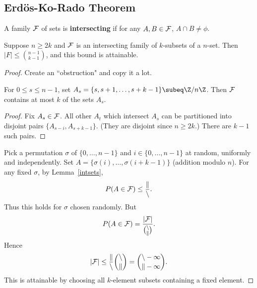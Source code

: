\subsection{Erd\"os-Ko-Rado Theorem}
\begin{df}
A family $\cal F$ of sets is \textbf{intersecting} if for any $A,B\in \cal F$, $A\cap B\neq \phi$. 
\end{df}
\begin{thm}
Suppose $n\geq 2k$ and $\cal F$ is an intersecting family of $k$-subsets of a $n$-set. Then $|F|\leq \binom{n-1}{k-1}$, and this bound is attainable.
\end{thm}
\begin{proof}
Create an ``obstruction" and copy it a lot.
\begin{lem}\label{intsets}
For $0\leq s\leq n-1$, set $A_s=\{s,s+1,\ldots, s+k-1\}\subeq \Z/n\Z$. Then $\cal F$ contains at most $k$ of the sets $A_s$.
\end{lem}
\begin{proof}
Fix $A_s\in \cal F$. All other $A_t$ which intersect $A_s$ can be partitioned into disjoint pairs $\{A_{s-i},A_{s+k-1}\}$. (They are disjoint since $n\geq 2k$.) There are $k-1$ such pairs.
\end{proof}
Pick a permutation $\sigma$ of $\{0,\ldots, n-1\}$ and $i\in \{0,\ldots, n-1\}$ at random, uniformly and independently. Set $A=\{\sigma(i),\ldots, \sigma(i+k-1)\}$ (addition modulo $n$). For any fixed $\sigma$, by Lemma~\ref{intsets},
\[
P(A\in \cal F)\leq \frac{k}{n}.
\]
Thus this holds for $\sigma$ chosen randomly. But
\[
P(A\in \cal F)=\frac{|F|}{\binom nk}.\]
Hence
\[
|\cal F|\leq \frac kn \binom nk=\binom{n-1}{k-1}.
\]
This is attainable by choosing all $k$-element subsets containing a fixed element.
\end{proof}